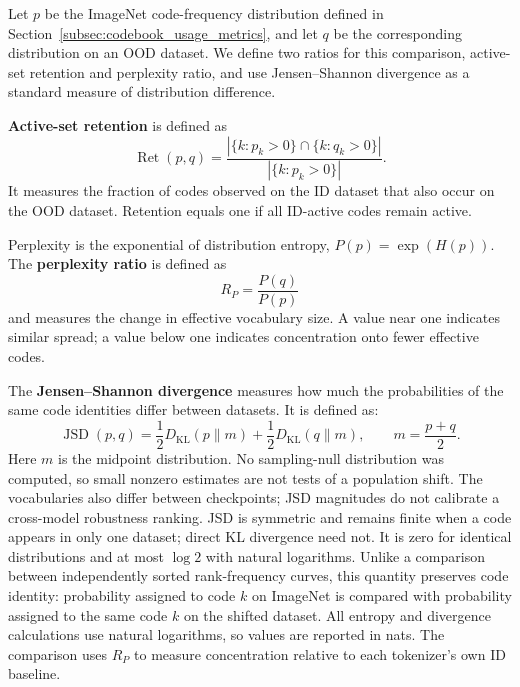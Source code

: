 Let $p$ be the ImageNet code-frequency distribution defined in
Section~\ref{subsec:codebook_usage_metrics}, and let $q$ be the corresponding
distribution on an OOD dataset. We define two ratios for this comparison,
active-set retention and perplexity ratio, and use Jensen--Shannon divergence
as a standard measure of distribution difference.

\textbf{Active-set retention} is defined as
\begin{equation}
    \operatorname{Ret}(p,q)=
    \frac{|\{k:p_k>0\}\cap\{k:q_k>0\}|}{|\{k:p_k>0\}|}.
    \label{eq:rq5_active_retention}
\end{equation}
It measures the fraction of codes observed on the ID dataset that also occur
on the OOD dataset. Retention equals one if all ID-active codes remain active.

Perplexity is the exponential of distribution entropy,
$P(p)=\exp(H(p))$. The \textbf{perplexity ratio} is defined as
\begin{equation}
    R_P = \frac{P(q)}{P(p)}
    \label{eq:rq5_perplexity_ratio}
\end{equation}
and measures the change in effective vocabulary size. A value near one indicates
similar spread; a value below one indicates concentration onto fewer effective
codes.

The \textbf{Jensen--Shannon divergence} measures how much the probabilities of
the same code identities differ between datasets. It is defined as:
\begin{equation}
    \operatorname{JSD}(p,q)
    = \frac{1}{2}D_{\mathrm{KL}}(p\|m)
    + \frac{1}{2}D_{\mathrm{KL}}(q\|m),
    \qquad m=\frac{p+q}{2}.
    \label{eq:rq5_jsd}
\end{equation}
Here $m$ is the midpoint distribution. No sampling-null distribution was
computed, so small nonzero estimates are not tests of a population shift.
The vocabularies also differ between checkpoints; JSD magnitudes do not
calibrate a cross-model robustness ranking. JSD is symmetric and remains finite
when a code appears in only one dataset; direct KL divergence need not.
It is zero for identical distributions and at most $\log 2$ with natural
logarithms. Unlike a comparison between independently sorted rank-frequency curves, this
quantity preserves code identity: probability assigned to code $k$ on
ImageNet is compared with probability assigned to the same code $k$ on the
shifted dataset. All entropy and divergence calculations use natural
logarithms, so values are reported in nats. The comparison uses $R_P$ to
measure concentration relative to each tokenizer's own ID baseline.

